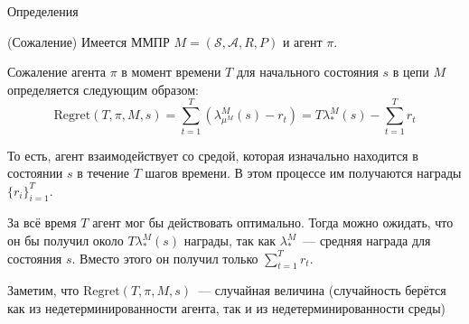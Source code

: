 \documentclass{beamer}
\newcommand{\Reg}{\mbox{Regret}}
\newcommand{\Ss}{\mathcal{S}}
\newcommand{\A}{\mathcal{A}}
\begin{document}
\begin{frame}{Определения}
\begin{definition}{(Сожаление)}
	Имеется ММПР $M=(\Ss, \A,R,P)$ и агент $\pi$.
	
	Сожаление агента $\pi$ в момент времени $T$ для начального состояния $s$ в цепи $M$ определяется следующим образом:
	$$\Reg(T,\pi,M,s)=\sum\limits_{t=1}^T(\lambda^M_{\mu^M}(s)-r_t)=T\lambda_*^M(s)-\sum\limits_{t=1}^Tr_t$$
	
	То есть, агент взаимодействует со средой, которая изначально находится в состоянии $s$ в течение $T$ шагов времени. В этом процессе им получаются награды $\{r_i\}_{i=1}^T$.
	
	За всё время $T$ агент мог бы действовать оптимально. Тогда можно ожидать, что он бы получил около $T\lambda_*^M(s)$ награды, так как $\lambda_*^M$~--- средняя награда для состояния $s$. Вместо этого он получил только $\sum\limits_{t=1}^Tr_t$.
	
	Заметим, что $\Reg(T,\pi,M,s)$~--- случайная величина (случайность берётся как из недетерминированности агента, так и из недетерминированности среды)
\end{definition}
\end{frame}
\end{document}
